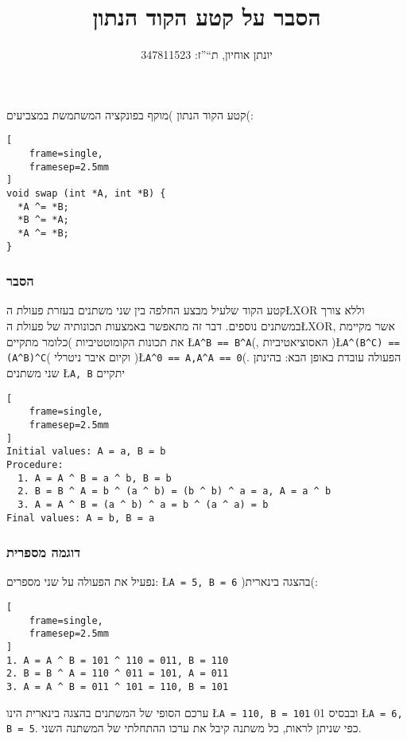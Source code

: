 \documentclass[11pt, oneside]{article}
\title{הסבר על קטע הקוד הנתון}
\author{יונתן אוחיון, ת``''ז: 347811523}
\begin{document}
\maketitle
קטע הקוד הנתון )מוקף בפונקציה המשתמשת במצביעים(:
\begin{otherlanguage}{english}
\begin{Verbatim}[
	frame=single,
	framesep=2.5mm
]
void swap (int *A, int *B) {
  *A ^= *B;
  *B ^= *A;
  *A ^= *B;
}
\end{Verbatim}
\end{otherlanguage}

\subsubsection*{הסבר}
קטע הקוד שלעיל מבצע החלפה בין שני משתנים בעזרת פעולת ה\L{XOR} וללא צורך במשתנים נוספים. דבר זה מתאפשר באמצעות תכונותיה של פעולת ה\L{XOR}, אשר מקיימת את תכונות הקומוטטיביות )כלומר מתקיים \L{\verb!A^B == B^A!}(, האסוציאטיביות )\L{\verb!A^(B^C) == (A^B)^C!}( וקיום איבר ניטרלי )\L{\verb!A^0 == A,A^A == 0!}(. הפעולה עובדת באופן הבא: בהינתן שני משתנים \L{\verb!A, B!} יתקיים
\begin{otherlanguage}{english}
\begin{Verbatim}[
	frame=single,
	framesep=2.5mm
]
Initial values: A = a, B = b
Procedure:
  1. A = A ^ B = a ^ b, B = b
  2. B = B ^ A = b ^ (a ^ b) = (b ^ b) ^ a = a, A = a ^ b
  3. A = A ^ B = (a ^ b) ^ a = b ^ (a ^ a) = b
Final values: A = b, B = a
\end{Verbatim}
\end{otherlanguage}

\subsubsection*{דוגמה מספרית}
נפעיל את הפעולה על שני מספרים: \L{\verb!A = 5, B = 6!} )בהצגה בינארית(:
\begin{otherlanguage}{english}
\begin{Verbatim}[
	frame=single,
	framesep=2.5mm
]
1. A = A ^ B = 101 ^ 110 = 011, B = 110
2. B = B ^ A = 110 ^ 011 = 101, A = 011
3. A = A ^ B = 011 ^ 101 = 110, B = 101
\end{Verbatim}
\end{otherlanguage}
ערכם הסופי של המשתנים בהצגה בינארית הינו \L{\verb!A = 110, B = 101!} ובבסיס 01 \L{\verb!A = 6, B = 5!}. כפי שניתן לראות, כל משתנה קיבל את ערכו ההתחלתי של המשתנה השני.
\end{document}
